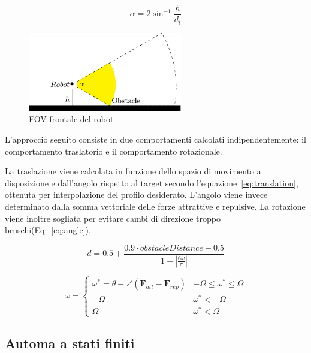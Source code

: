 \documentclass[a4paper]{article}
\begin{document}
	\begin{equation}\label{eq:obstacle_fov}
		\alpha = {2}\sin^{-1}{\frac{h}{d_t}}
	\end{equation}

	\begin{figure}[H]
		\centering
		\includegraphics[width=0.6\textwidth]{./img/obstacle_fov.pdf}
		\caption{FOV frontale del robot}
		\label{fig:obstacle_fov}
	\end{figure}

	L'approccio seguito consiste in due comportamenti calcolati
	indipendentemente: il comportamento traslatorio e il comportamento
	rotazionale.

	La traslazione viene calcolata in funzione dello spazio di movimento a
	disposizione e dall'angolo rispetto al target secondo
	l'equazione~\ref{eq:translation}, ottenuta per interpolazione del profilo
	desiderato. L'angolo viene invece determinato dalla somma vettoriale delle
	forze attrattive e repulsive. La rotazione viene inoltre sogliata per
	evitare cambi di direzione troppo bruschi(Eq.~\ref{eq:angle}).

	\begin{equation}\label{eq:translation}
		d = 0.5 + \frac	{0.9\cdot obstacleDistance - 0.5}
		{1 + \left|
				\frac{6\omega}{\pi}
		\right|  } 
	\end{equation}
	
	\begin{equation}\label{eq:angle}
		\omega = \begin{cases}
			\omega^*=\theta - \angle\left( \textbf{F}_{att} - \textbf{F}_{rep} \right)  & -\Omega \le \omega^* \le \Omega \\
			-\Omega & \omega^* < -\Omega \\
			\Omega & \omega^* < \Omega

		\end{cases}	\end{equation}
	
	\newpage
	\subsection{Automa a stati finiti}\label{subsec:Pianificazione}
	
\end{document}
